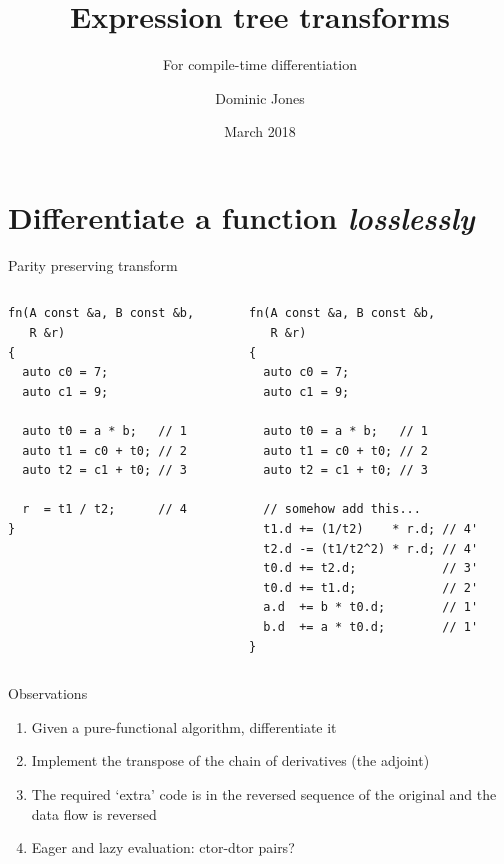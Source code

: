 \documentclass[xcolor=dvipsnames]{beamer}
\title{Expression tree transforms}
\subtitle{For compile-time differentiation}
\author{Dominic Jones}
\date{\tiny{March 2018}}
\institute{\texttt{dominic.jones@gmx.co.uk}}
\begin{document}
\begin{frame}[plain]
  \titlepage
\end{frame}


\section{Differentiate a function \protect\textit{losslessly}}


\begin{frame}[fragile]{Parity preserving transform}
  \begin{columns}[T] %
    \begin{column}{0.44\textwidth}
      {\color{gray}{write something like this \dots}}
      \begin{lstlisting}
fn(A const &a, B const &b,
   R &r)
{
  auto c0 = 7;
  auto c1 = 9;

  auto t0 = a * b;   // 1
  auto t1 = c0 + t0; // 2
  auto t2 = c1 + t0; // 3

  r  = t1 / t2;      // 4
}
  \end{lstlisting}
    \end{column}%
    \hfill%
    \begin{column}{0.56\textwidth}
      {\color{gray}{to implement something like this}}
        \begin{lstlisting}
fn(A const &a, B const &b,
   R &r)
{
  auto c0 = 7;
  auto c1 = 9;

  auto t0 = a * b;   // 1
  auto t1 = c0 + t0; // 2
  auto t2 = c1 + t0; // 3

  // somehow add this...
  t1.d += (1/t2)    * r.d; // 4'
  t2.d -= (t1/t2^2) * r.d; // 4'
  t0.d += t2.d;            // 3'
  t0.d += t1.d;            // 2'
  a.d  += b * t0.d;        // 1'
  b.d  += a * t0.d;        // 1'
}
  \end{lstlisting}
    \end{column}%
  \end{columns}
\end{frame}


\begin{frame}[fragile]{Observations}
  \begin{enumerate}
  \item Given a pure-functional algorithm, differentiate it \vspace{5mm}
  \item Implement the transpose of the chain of derivatives (the adjoint) \vspace{5mm}
  \item The required `extra' code is in the reversed sequence of the original and the data flow is reversed \vspace{5mm}
  \item Eager and lazy evaluation: ctor-dtor pairs? \vspace{5mm}
  \end{enumerate}
\end{frame}
\end{document}
